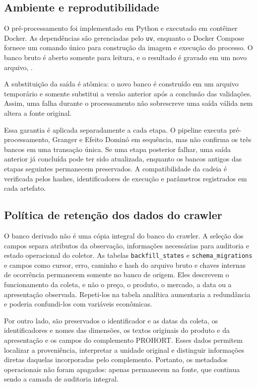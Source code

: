 \documentclass[12pt,a4paper]{article}
\begin{document}
\subsection{Ambiente e reprodutibilidade}

O pré-processamento foi implementado em Python e executado em contêiner Docker.
As dependências são gerenciadas pelo \texttt{uv}, enquanto o Docker Compose
fornece um comando único para construção da imagem e execução do processo. O
banco bruto é aberto somente para leitura, e o resultado é gravado em um novo
arquivo, .

A substituição da saída é atômica: o novo banco é construído em um arquivo
temporário e somente substitui a versão anterior após a conclusão das
validações. Assim, uma falha durante o processamento não sobrescreve uma saída
válida nem altera a fonte original.

Essa garantia é aplicada separadamente a cada etapa. O pipeline executa
pré-processamento, Granger e Efeito Dominó em sequência, mas não confirma os
três bancos em uma transação única. Se uma etapa posterior falhar, uma saída
anterior já concluída pode ter sido atualizada, enquanto os bancos antigos das
etapas seguintes permanecem preservados. A compatibilidade da cadeia é
verificada pelos hashes, identificadores de execução e parâmetros registrados
em cada artefato.

\subsection{Política de retenção dos dados do crawler}

O banco derivado não é uma cópia integral do banco do crawler. A seleção dos
campos separa atributos da observação, informações necessárias para auditoria e
estado operacional do coletor. As tabelas \texttt{backfill\_states} e
\texttt{schema\_migrations} e campos como cursor, erro, caminho e hash do
arquivo bruto e chaves internas de ocorrência permanecem somente no banco de
origem. Eles descrevem o funcionamento da coleta, e não o preço, o produto, o
mercado, a data ou a apresentação observada. Repeti-los na tabela analítica
aumentaria a redundância e poderia confundi-los com variáveis econômicas.

Por outro lado, são preservados o identificador e as datas da coleta, os
identificadores e nomes das dimensões, os textos originais do produto e da
apresentação e os campos do complemento PROHORT. Esses dados permitem localizar
a proveniência, interpretar a unidade original e distinguir informações diretas
daquelas incorporadas pelo complemento. Portanto, os metadados operacionais
não foram apagados: apenas permanecem na fonte, que continua sendo a camada de
auditoria integral.
\end{document}
